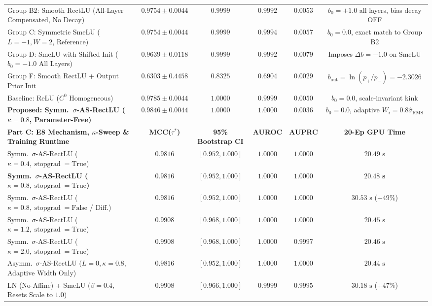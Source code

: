 \documentclass[10pt,a4paper]{article}
\begin{document}
\begin{table}[t]
\begin{tabular}{lccccc}
Group B2: Smooth RectLU (All-Layer Compensated, No Decay) & $0.9754 \pm 0.0044$ & $0.9999$ & $0.9992$ & $0.0053$ & $b_0 = +1.0$ all layers, bias decay OFF \\
Group C: Symmetric SmeLU ($L=-1, W=2$, Reference) & $0.9754 \pm 0.0044$ & $0.9999$ & $0.9994$ & $0.0057$ & $b_0 = 0.0$, exact match to Group B2 \\
Group D: SmeLU with Shifted Init ($b_0 = -1.0$ All Layers) & $0.9639 \pm 0.0118$ & $0.9999$ & $0.9992$ & $0.0079$ & Imposes $\Delta b = -1.0$ on SmeLU \\
Group F: Smooth RectLU + Output Prior Init & $0.6303 \pm 0.4458$ & $0.8325$ & $0.6904$ & $0.0029$ & $b_{\text{out}} = \ln(p_+/p_-) = -2.3026$ \\
Baseline: ReLU ($C^0$ Homogeneous) & $0.9785 \pm 0.0044$ & $1.0000$ & $0.9999$ & $0.0050$ & $b_0 = 0.0$, scale-invariant kink \\
\textbf{Proposed: Symm.\ $\sigma$-AS-RectLU ($\kappa=0.8$, Parameter-Free)} & $\mathbf{0.9846 \pm 0.0044}$ & $\mathbf{1.0000}$ & $\mathbf{1.0000}$ & $\mathbf{0.0036}$ & $b_0 = 0.0$, adaptive $W_i = 0.8\hat{\sigma}_{\text{RMS}}$ \\
\midrule
\textbf{Part C: E8 Mechanism, $\kappa$-Sweep \& Training Runtime} & \textbf{MCC($\tau^*$)} & \textbf{95\% Bootstrap CI} & \textbf{AUROC} & \textbf{AUPRC} & \textbf{20-Ep GPU Time} \\
\midrule
Symm.\ $\sigma$-AS-RectLU ($\kappa = 0.4, \operatorname{stopgrad}=\text{True}$) & $0.9816$ & $[0.952, 1.000]$ & $1.0000$ & $1.0000$ & $20.49\text{ s}$ \\
\textbf{Symm.\ $\sigma$-AS-RectLU ($\kappa = 0.8, \operatorname{stopgrad}=\text{True}$)} & $0.9816$ & $[0.952, 1.000]$ & $\mathbf{1.0000}$ & $\mathbf{1.0000}$ & $\mathbf{20.48\text{ s}}$ \\
Symm.\ $\sigma$-AS-RectLU ($\kappa = 0.8, \operatorname{stopgrad}=\text{False}$ / Diff.) & $0.9816$ & $[0.952, 1.000]$ & $1.0000$ & $1.0000$ & $30.53\text{ s}$ ($+49\%$) \\
Symm.\ $\sigma$-AS-RectLU ($\kappa = 1.2, \operatorname{stopgrad}=\text{True}$) & $\mathbf{0.9908}$ & $[0.968, 1.000]$ & $1.0000$ & $1.0000$ & $20.45\text{ s}$ \\
Symm.\ $\sigma$-AS-RectLU ($\kappa = 2.0, \operatorname{stopgrad}=\text{True}$) & $\mathbf{0.9908}$ & $[0.968, 1.000]$ & $1.0000$ & $0.9997$ & $20.46\text{ s}$ \\
Asymm.\ $\sigma$-AS-RectLU ($L=0, \kappa = 0.8$, Adaptive Width Only) & $0.9816$ & $[0.952, 1.000]$ & $1.0000$ & $1.0000$ & $20.44\text{ s}$ \\
LN (No-Affine) + SmeLU ($\beta = 0.4$, Resets Scale to $1.0$) & $\mathbf{0.9908}$ & $[0.966, 1.000]$ & $0.9999$ & $0.9995$ & $30.18\text{ s}$ ($+47\%$) \\
\bottomrule
\end{tabular}
\end{table}
\end{document}
